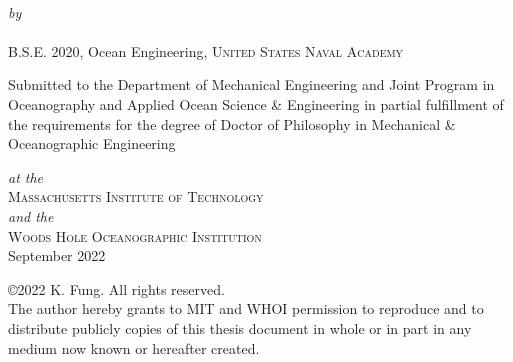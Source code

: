 \def\signature#1#2{\par\noindent#1\dotfill\null\\*
  {\raggedleft #2\par}}


\makeatletter

\begin{titlepage}
  \begin{center}
    \begin{Large}
      \@title
    \end{Large}\\[0.1em]
    \emph{\footnotesize by}\\
    {\large \@author} \\[-0.25em]
    B.S.E. 2020, Ocean Engineering, \textsc{United States Naval Academy} \\ %
    
    \begin{singlespace}
    {Submitted to the Department of Mechanical Engineering and Joint Program in Oceanography and Applied Ocean Science \& Engineering in partial fulfillment of the requirements for the degree of Doctor of Philosophy in Mechanical \& Oceanographic Engineering} \\
    \end{singlespace}
     \begin{singlespace}
    \emph{\footnotesize at the}\\
    {\large \textsc{Massachusetts Institute of Technology}} \\
    \emph{\footnotesize and the}\\
    {\large \textsc{Woods Hole Oceanographic Institution}} \\ [1 em]
    September 2022 \\[1em]
    \end{singlespace}
    \begin{singlespace}
    {\copyright2022 K. Fung. All rights reserved. \\ The author hereby grants to MIT and WHOI permission to reproduce and to distribute publicly copies of this thesis document in whole or in part in any medium now known or hereafter created.} \\ [2em]


\end{singlespace}
\end{center}
\end{titlepage}
